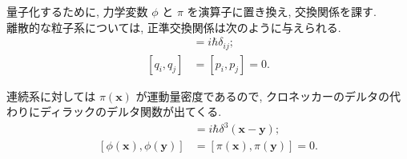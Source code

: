\documentclass[a4paper,12pt]{article}
\begin{document}
量子化するために, 力学変数 $\phi$ と $\pi$ を演算子に置き換え, 交換関係を課す.\\
離散的な粒子系については, 正準交換関係は次のように与えられる.
\begin{align*}
    [q_i, p_j] &= i\hbar \delta_{ij};\\
    [q_i, q_j] &= [p_i, p_j] = 0.
\end{align*}

連続系に対しては $\pi(\boldsymbol{x})$ が運動量密度であるので, クロネッカーのデルタの代わりにディラックのデルタ関数が出てくる.
\begin{align*}
    [\phi(\boldsymbol{x}), \pi(\boldsymbol{y})] &= i\hbar \delta^3(\boldsymbol{x} - \boldsymbol{y});\\
    [\phi(\boldsymbol{x}), \phi(\boldsymbol{y})] &= [\pi(\boldsymbol{x}), \pi(\boldsymbol{y})] = 0.\tag{2-20}
\end{align*}


 
\end{document}
